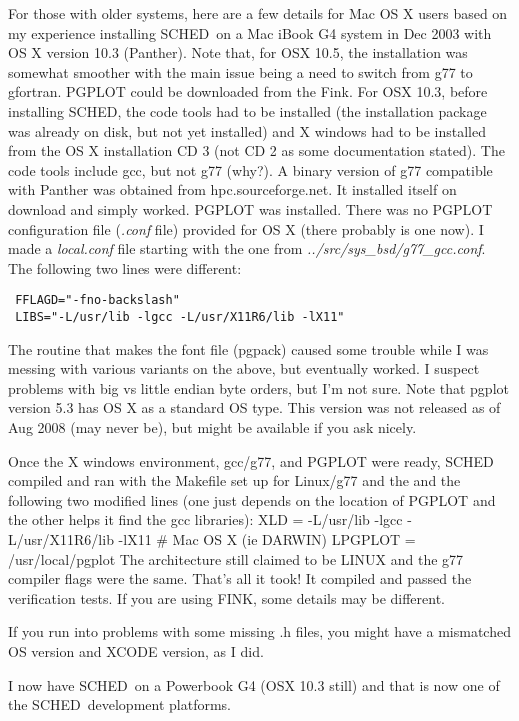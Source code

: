 \documentclass{report}
\newcommand{\sched}{{\sc SCHED}}
\newcommand{\schedb}{{\sc SCHED~}}
\begin{document}
For those with older systems, here are a few details for Mac OS X
users based on my experience installing \schedb on a Mac iBook G4
system in Dec 2003 with OS X version 10.3 (Panther).  Note that, for
OSX 10.5, the installation was somewhat smoother with the main issue
being a need to switch from g77 to gfortran.  PGPLOT could be
downloaded from the Fink.  For OSX 10.3, before installing \sched, the
code tools had to be installed (the installation package was already
on disk, but not yet installed) and X windows had to be installed from
the OS X installation CD 3 (not CD 2 as some documentation stated).
The code tools include gcc, but not g77 (why?).  A binary version of
g77 compatible with Panther was obtained from hpc.sourceforge.net.  It
installed itself on download and simply worked.  PGPLOT was installed.
There was no PGPLOT configuration file ({\sl .conf} file) provided for
OS X (there probably is one now).  I made a {\sl local.conf} file
starting with the one from {\sl ../src/sys\_bsd/g77\_gcc.conf}. The
following two lines were different: 
\begin{verbatim}
 FFLAGD="-fno-backslash"
 LIBS="-L/usr/lib -lgcc -L/usr/X11R6/lib -lX11"
\end{verbatim}

The routine that makes the font file (pgpack) caused some trouble
while I was messing with various variants on the above, but eventually
worked.  I suspect problems with big vs little endian byte orders, but
I'm not sure. Note that pgplot version 5.3 has OS X as a standard OS
type.  This version was not released as of Aug 2008 (may never be), but
might be available if you ask nicely.

Once the X windows environment, gcc/g77, and PGPLOT were ready, SCHED
compiled and ran with the Makefile set up for Linux/g77 and the
and the following two modified lines (one just depends on the location
of PGPLOT and the other helps it find the gcc libraries):
XLD = -L/usr/lib -lgcc -L/usr/X11R6/lib -lX11 \# Mac OS X (ie DARWIN)
LPGPLOT = /usr/local/pgplot
The architecture still claimed to be LINUX and the g77 compiler flags
were the same.  That's all it took!  It compiled and passed the
verification tests.  If you are using FINK, some details may be different.

If you run into problems with some missing .h files, you might have a
mismatched OS version and XCODE version, as I did.

I now have \schedb on a Powerbook G4 (OSX 10.3 still) and that is now
one of the \schedb development platforms.
\end{document}
